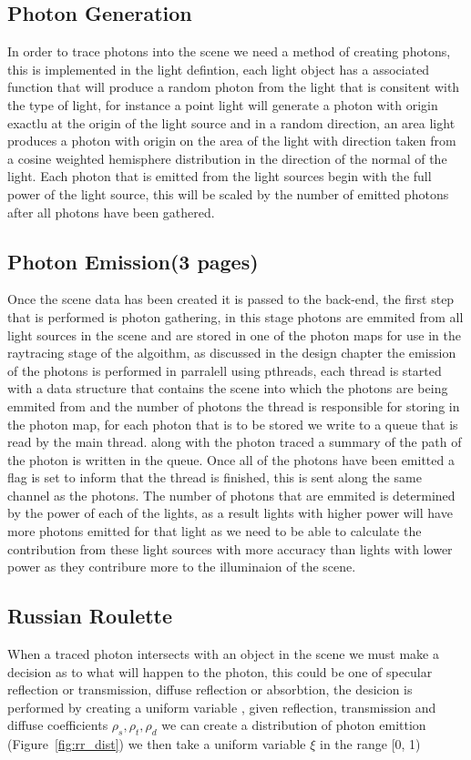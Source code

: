 \subsection{Photon Generation}
In order to trace photons into the scene we need a method of creating photons, this is implemented in the light defintion,
each light object has a associated function that will produce a random photon from the light that is consitent with the
type of light, for instance a point light will generate a photon with origin exactlu at the origin of the light source and
in a random direction, an area light produces a photon with origin on the area of the light with direction taken from a
cosine weighted hemisphere distribution in the direction of the normal of the light. Each photon that is emitted from the
light sources begin with the full power of the light source, this will be scaled by the number of emitted photons after
all photons have been gathered.

\subsection{Photon Emission(3 pages)}
Once the scene data has been created it is passed to the back-end, the first step that is performed is photon gathering,
in this stage photons are emmited from all light sources in the scene and are stored in one of the photon maps for use
in the raytracing stage of the algoithm, as discussed in the design chapter the emission of the photons is performed in
parralell using pthreads, each thread is started with a data structure that contains the scene into which the photons
are being emmited from and the number of photons the thread is responsible for storing in the photon map, for each photon
that is to be stored we write to a queue that is read by the main thread. along with the photon traced a summary of the
path of the photon is written in the queue. Once all of the photons have been emitted a flag is set to inform that the
thread is finished, this is sent along the same channel as the photons. The number of photons that are emmited is determined
by the power of each of the lights, as a result lights with higher power will have more photons emitted for that light as
we need to be able to calculate the contribution from these light sources with more accuracy than lights with lower power
as they contribure more to the illuminaion of the scene.

\subsection{Russian Roulette}
When a traced photon intersects with an object in the scene we must make a decision as to what will happen to the photon,
this could be one of specular reflection or transmission, diffuse reflection or absorbtion, the desicion is performed
by creating a uniform variable , given reflection, transmission and diffuse coefficients
$\rho_{s}, \rho_{t}, \rho_{d}$ we can create a distribution of photon emittion (Figure~\ref{fig:rr_dist}) we then take
a uniform variable $\xi$ in the range [0, 1) 


